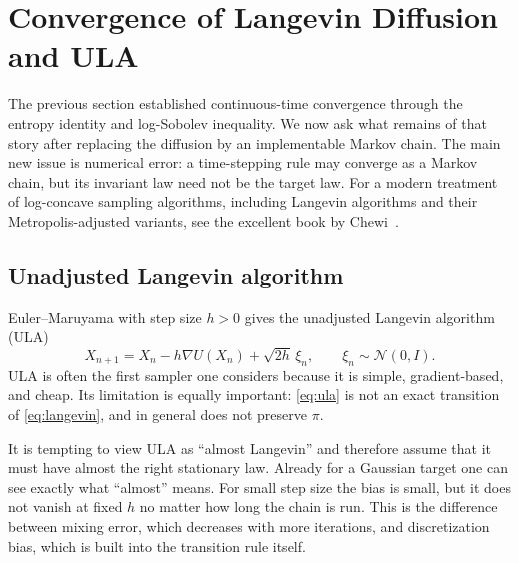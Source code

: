 \documentclass[10pt,a4paper]{amsart}
\numberwithin{equation}{section}
\newcommand{\Id}{I}
\newcommand{\normal}[2]{\mathcal{N}\!\left(#1,#2\right)}
\begin{document}
\section{Convergence of Langevin Diffusion and ULA}

The previous section established continuous-time convergence through the entropy identity and log-Sobolev inequality.  We now ask what remains of that story after replacing the diffusion by an implementable Markov chain.  The main new issue is numerical error: a time-stepping rule may converge as a Markov chain, but its invariant law need not be the target law.  For a modern treatment of log-concave sampling algorithms, including Langevin algorithms and their Metropolis-adjusted variants, see the excellent book by Chewi~\cite{chewi2024logconcave}.

\subsection{Unadjusted Langevin algorithm}

Euler--Maruyama with step size $h>0$ gives the unadjusted Langevin algorithm (ULA)
\begin{equation}\label{eq:ula}
    X_{n+1}=X_n-h\nabla U(X_n)+\sqrt{2h}\,\xi_n,
    \qquad \xi_n\sim\normal{0}{\Id}.
\end{equation}
ULA is often the first sampler one considers because it is simple, gradient-based, and cheap.  Its limitation is equally important: \eqref{eq:ula} is not an exact transition of \eqref{eq:langevin}, and in general does not preserve $\pi$.

It is tempting to view ULA as ``almost Langevin'' and therefore assume that it must have almost the right stationary law.  Already for a Gaussian target one can see exactly what ``almost'' means.  For small step size the bias is small, but it does not vanish at fixed $h$ no matter how long the chain is run.  This is the difference between mixing error, which decreases with more iterations, and discretization bias, which is built into the transition rule itself.
\end{document}
